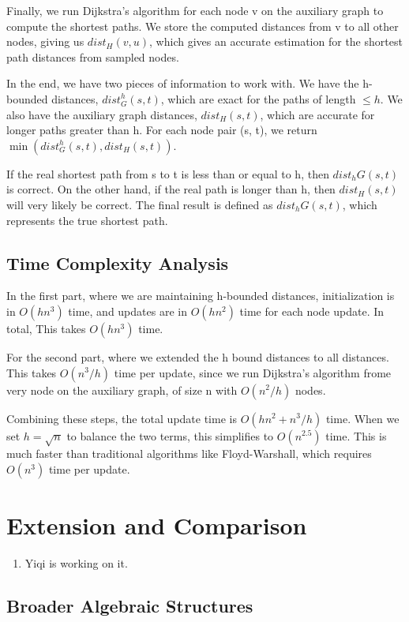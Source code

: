 \documentclass[12pt]{article}
\begin{document}
Finally, we run Dijkstra's algorithm for each node v on the auxiliary graph to compute the shortest paths. We store the computed distances from v to all other nodes, giving us $dist_H(v, u)$, which gives an accurate estimation for the shortest path distances from sampled nodes.

In the end, we have two pieces of information to work with. We have the h-bounded distances, $dist_G^h(s, t)$, which are exact for the paths of length $\leq h$. We also have the auxiliary graph distances, $dist_H(s, t)$, which are accurate for longer paths greater than h. For each node pair (s, t), we return $\min({dist_G^h(s, t), dist_H(s, t)})$.

If the real shortest path from s to t is less than or equal to h, then $dist_hG(s, t)$ is correct. On the other hand, if the real path is longer than h, then $dist_H(s, t)$ will very likely be correct. The final result is defined as $dist_hG(s, t)$, which represents the true shortest path.

\subsection{Time Complexity Analysis}

In the first part, where we are maintaining h-bounded distances, initialization is in $O(hn^3)$ time, and updates are in $O(hn^2)$ time for each node update. In total, This takes $O(hn^3)$ time.

For the second part, where we extended the h bound distances to all distances. This takes $O(n^3/h)$ time per update, since we run Dijkstra's algorithm frome very node on the auxiliary graph, of size n with $O(n^2/h)$ nodes.

Combining these steps, the total update time is $O(hn^2 + n^3/h)$ time. When we set $h = \sqrt{n}$ to balance the two terms, this simplifies to $O(n^{2.5})$ time. This is much faster than traditional algorithms  like Floyd-Warshall, which requires $O(n^3)$ time per update.

\section{Extension and Comparison}

\begin{enumerate}
    \item Yiqi is working on it.
\end{enumerate}

\subsection{Broader Algebraic Structures}
\end{document}
